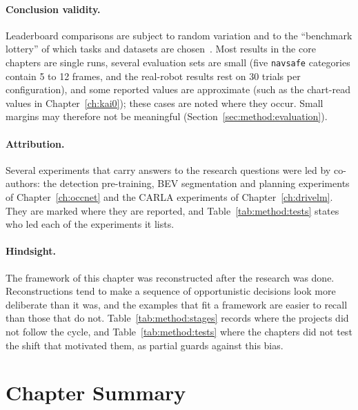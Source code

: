 \paragraph{Conclusion validity.} Leaderboard comparisons are subject to random variation and to the ``benchmark lottery'' of which tasks and datasets are chosen~\cite{dehghani2021benchmark}. Most results in the core chapters are single runs, several evaluation sets are small (five \texttt{navsafe} categories contain 5 to 12 frames, and the real-robot results rest on 30 trials per configuration), and some reported values are approximate (such as the chart-read values in Chapter~\ref{ch:kai0}); these cases are noted where they occur. Small margins may therefore not be meaningful (Section~\ref{sec:method:evaluation}).

\paragraph{Attribution.} Several experiments that carry answers to the research questions were led by co-authors: the detection pre-training, BEV segmentation and planning experiments of Chapter~\ref{ch:occnet} and the CARLA experiments of Chapter~\ref{ch:drivelm}. They are marked where they are reported, and Table~\ref{tab:method:tests} states who led each of the experiments it lists.

\paragraph{Hindsight.} The framework of this chapter was reconstructed after the research was done. Reconstructions tend to make a sequence of opportunistic decisions look more deliberate than it was, and the examples that fit a framework are easier to recall than those that do not. Table~\ref{tab:method:stages} records where the projects did not follow the cycle, and Table~\ref{tab:method:tests} where the chapters did not test the shift that motivated them, as partial guards against this bias.

\section{Chapter Summary}\label{sec:method:summary}

